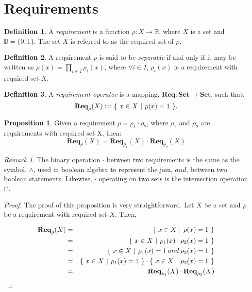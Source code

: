 \documentclass{article}
\theoremstyle{definition}
\newtheorem{definition}{Definition}[section]
\newtheorem{proposition}{Proposition}[section]
\theoremstyle{remark}
\newtheorem*{remark}{Remark}
\newcommand{\reqfunc}[2]{#1:#2\rightarrow\mathbb{B}}
\newcommand{\reqop}[2]{\mathbf{Req}_{#1}(#2)}
\newcommand{\setbuild}[3]
{
	\{\hspace{0.05in} 
	#1 \in #2 \hspace{0.05in} 
	| \hspace{0.05in}#3\hspace{0.05in}
	\}	
}
\begin{document}
	\section{Requirements}
	
		\begin{definition}
			A \emph{requirement} is a function $\reqfunc{\rho}{X}$, where $X$ is a set and $\mathbb{B} = \{0,1\}$. The set $X$ is referred to as the required set of $\rho$.
		\end{definition}
		
		\begin{definition}
			A requirement $\rho$ is said to be \emph{separable} if and only if it may be written as $\rho(x) = \prod_{i \in I}{\rho_{i}(x)}$, where $\forall i \in I$, $\rho_{i}(x)$ is a requirement with required set $X$.
		\end{definition}
		
		\begin{definition}
			A \emph{requirement operator} is a mapping, $\mathbf{Req}: \mathbf{Set} \rightarrow \mathbf{Set}$, such that: \[\reqop{\rho}{X} := \setbuild{x}	{X}{\rho(x) = 1}.\]
		\end{definition}
		
		\begin{proposition}
			Given a requirement $\rho = \rho_{1}\cdot\rho_{2}$, where $\rho_{1}$ and $\rho_{2}$ are requirements with required set X, then: 
			\[
			\reqop{\rho}{X}\stackrel{~}{=}\reqop{\rho_{1}}{X}\cdot\reqop{\rho_{2}}{X}
			\]
		\end{proposition}
		
		\begin{remark}
			The binary operation $\cdot$ between two requirements is the same as the symbol, $\wedge$, used in boolean algebra to represent the join, $and$, between two boolean statements. Likewise, $\cdot$ operating on two sets is the intersection operation $\cap$. 
		\end{remark}
		
		\begin{proof}
			The proof of this proposition is very straightforward. Let $X$ be a set and $\rho$ be a requirement with required set $X$. Then,
			
			\begin{eqnarray}
			\reqop{\rho}{X} & = & \setbuild{x}{X}{\rho(x) = 1}\\ 
			& = & \setbuild{x}{X}{\rho_{1}(x)\cdot\rho_{2}(x) = 1}\\ 
			& = & \setbuild{x}{X}{\rho_{1}(x) = 1 \mathbin{and} \rho_{2}(x) = 1}\\ 
			& = & \setbuild{x}{X}{\rho_{1}(x) = 1}\cdot\setbuild{x}{X}{\rho_{2}(x) = 1}\\
			& = & \reqop{\rho_{1}}{X}\cdot\reqop{\rho_{2}}{X}
			\end{eqnarray}
		\end{proof}
	
\end{document}

